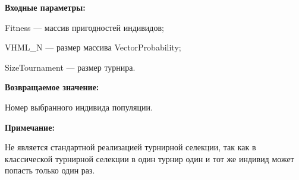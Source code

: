 \textbf{Входные параметры:}
 
Fitness --- массив пригодностей индивидов;
 
VHML\_N --- размер массива VectorProbability;
 
SizeTournament --- размер турнира.

\textbf{Возвращаемое значение:} 

 Номер выбранного индивида популяции.

\textbf{Примечание:}

 Не является стандартной реализацией турнирной селекции, так как в классической турнирной селекции в один турнир один и тот же индивид может попасть только один раз.

